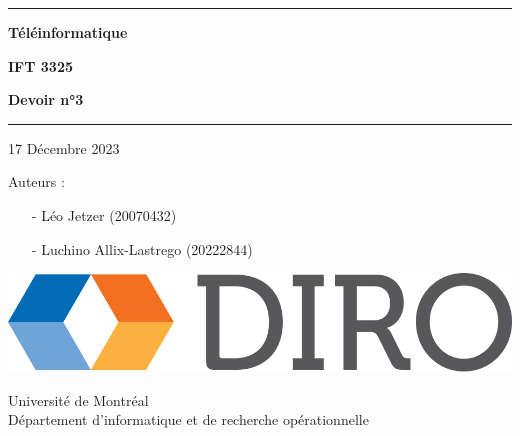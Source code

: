 \documentclass{article}
\begin{document}
\begin{titlepage}

	\begin{center}
		\hrule

		\vspace{.5cm}

		\Huge
		\textbf{Téléinformatique}

		\vspace{.3cm}
		\LARGE

		\textbf{IFT 3325}
		\vspace{.3cm}

		\textbf{Devoir n°3}
		\vspace{.3cm}

		\hrule

		\vspace{1cm}

		17 Décembre 2023 \\
	\end{center}

	\vspace{2cm}

	\LARGE

	\noindent Auteurs :

	\begin{enumerate}
		\item[-] Léo Jetzer (20070432)
		\item[-] Luchino Allix-Lastrego (20222844)   
	\end{enumerate}


			
	\vfill


	\begin{center}

		\includegraphics[scale=.1]{diro.png}

		\vspace{0.8cm}

		Université de Montréal\\
		Département d'informatique et de recherche opérationnelle\\

	\end{center}
	
\end{titlepage}
\end{document}
